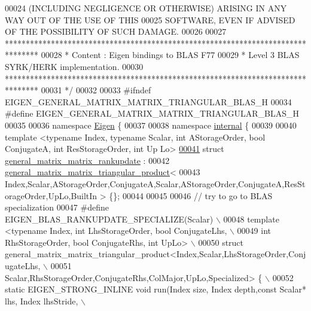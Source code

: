 \begin{DoxyCode}
00024 \textcolor{comment}{ (INCLUDING NEGLIGENCE OR OTHERWISE) ARISING IN ANY WAY OUT OF THE USE OF THIS}
00025 \textcolor{comment}{ SOFTWARE, EVEN IF ADVISED OF THE POSSIBILITY OF SUCH DAMAGE.}
00026 \textcolor{comment}{}
00027 \textcolor{comment}{ ********************************************************************************}
00028 \textcolor{comment}{ *   Content : Eigen bindings to BLAS F77}
00029 \textcolor{comment}{ *   Level 3 BLAS SYRK/HERK implementation.}
00030 \textcolor{comment}{ ********************************************************************************}
00031 \textcolor{comment}{*/}
00032 
00033 \textcolor{preprocessor}{#ifndef EIGEN\_GENERAL\_MATRIX\_MATRIX\_TRIANGULAR\_BLAS\_H}
00034 \textcolor{preprocessor}{#define EIGEN\_GENERAL\_MATRIX\_MATRIX\_TRIANGULAR\_BLAS\_H}
00035 
00036 \textcolor{keyword}{namespace }\hyperlink{namespace_eigen}{Eigen} \{
00037 
00038 \textcolor{keyword}{namespace }\hyperlink{namespaceinternal}{internal} \{
00039 
00040 \textcolor{keyword}{template} <\textcolor{keyword}{typename} Index, \textcolor{keyword}{typename} Scalar, \textcolor{keywordtype}{int} AStorageOrder, \textcolor{keywordtype}{bool} ConjugateA, \textcolor{keywordtype}{int} ResStorageOrder, \textcolor{keywordtype}{int}  Up
      Lo>
\hyperlink{struct_eigen_1_1internal_1_1general__matrix__matrix__rankupdate}{00041} \textcolor{keyword}{struct }\hyperlink{struct_eigen_1_1internal_1_1general__matrix__matrix__rankupdate}{general\_matrix\_matrix\_rankupdate} :
00042        \hyperlink{struct_eigen_1_1internal_1_1general__matrix__matrix__triangular__product}{general\_matrix\_matrix\_triangular\_product}<
00043          Index,Scalar,AStorageOrder,ConjugateA,Scalar,AStorageOrder,ConjugateA,ResStorageOrder,UpLo,BuiltIn
      > \{\};
00044 
00045 
00046 \textcolor{comment}{// try to go to BLAS specialization}
00047 \textcolor{preprocessor}{#define EIGEN\_BLAS\_RANKUPDATE\_SPECIALIZE(Scalar) \(\backslash\)}
00048 \textcolor{preprocessor}{template <typename Index, int LhsStorageOrder, bool ConjugateLhs, \(\backslash\)}
00049 \textcolor{preprocessor}{                          int RhsStorageOrder, bool ConjugateRhs, int  UpLo> \(\backslash\)}
00050 \textcolor{preprocessor}{struct general\_matrix\_matrix\_triangular\_product<Index,Scalar,LhsStorageOrder,ConjugateLhs, \(\backslash\)}
00051 \textcolor{preprocessor}{               Scalar,RhsStorageOrder,ConjugateRhs,ColMajor,UpLo,Specialized> \{ \(\backslash\)}
00052 \textcolor{preprocessor}{  static EIGEN\_STRONG\_INLINE void run(Index size, Index depth,const Scalar* lhs, Index lhsStride, \(\backslash\)}

\end{DoxyCode}
